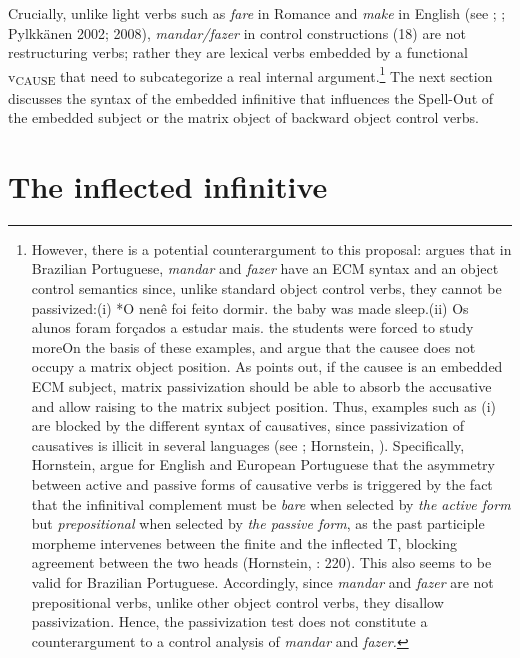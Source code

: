 \documentclass[output=paper]{langsci/langscibook}
\begin{document}
Crucially, unlike light verbs such as \textit{fare} in Romance and \textit{make} in English (see \citealt{Guasti1996}; \citealt{Folli2007}; Pylkkänen 2002; 2008), \textit{mandar/fazer} in control constructions (18) are not restructuring verbs; rather they are lexical verbs embedded by a functional v\textsubscript{CAUSE}  that need to subcategorize a real internal argument.\footnote{However, there is a potential counterargument to this proposal: \citet{Farrell1995} argues that in Brazilian Portuguese, \textit{mandar} and \textit{fazer} have an ECM syntax and an object control semantics since, unlike standard object control verbs, they cannot be passivized:(i)  *O nenê   foi feito    dormir.  the baby  was made  sleep.(ii)  Os alunos    foram forçados  a  estudar  mais.  the students were  forced      to study  moreOn the basis of these examples, \citet{Farrell1995} and \citet{Hornstein2003} argue that the causee does not occupy a matrix object position. As \citet{Landau2004} points out, if the causee is an embedded ECM subject, matrix passivization should be able to absorb the accusative and allow raising to the matrix subject position.   Thus, examples such as (i) are blocked by the different syntax of causatives, since passivization of causatives is illicit in several languages (see \citealt{Landau2004}; Hornstein, \citet{Martins2008}). Specifically, Hornstein, \citet{Martins2008} argue for English and European Portuguese that the asymmetry between active and passive forms of causative verbs is triggered by the fact that the infinitival complement must be \textit{bare} when selected by \textit{the active form} but \textit{prepositional} when selected by \textit{the passive form}, as the past participle morpheme intervenes between the finite and the inflected T, blocking agreement between the two heads (Hornstein, \citet{Martins2008}: 220).  This also seems to be valid for Brazilian Portuguese. Accordingly, since \textit{mandar} and \textit{fazer} are not prepositional verbs, unlike other object control verbs, they disallow passivization. Hence, the passivization test does not constitute a counterargument to a control analysis of \textit{mandar} and \textit{fazer.}} The next section discusses the syntax of the embedded infinitive that influences the Spell-Out of the embedded subject or the matrix object of backward object control verbs. 

\section{The inflected infinitive}%
\end{document}
